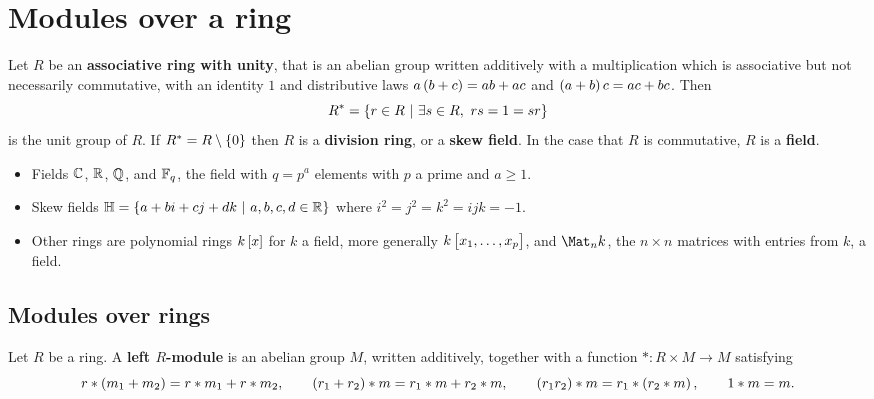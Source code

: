 \def\module{M4P63 Algebra IV}
\def\lecturer{Dr John Britnell}
\def\term{Spring 2020}
\def\cover{}
\def\syllabus{}
\def\thm{section}







\setcounter{section}{0}

\section{Modules over a ring}


Let $ R $ be an \textbf{associative ring with unity}, that is an abelian group written additively with a multiplication which is associative but not necessarily commutative, with an identity $ 1 $ and distributive laws $ a\br{b + c} = ab + ac $ and $ \br{a + b}c = ac + bc $. Then
$$ R^* = \cbr{r \in R \st \exists s \in R, \ rs = 1 = sr} $$
is the unit group of $ R $. If $ R^* = R \setminus \cbr{0} $ then $ R $ is a \textbf{division ring}, or a \textbf{skew field}. In the case that $ R $ is commutative, $ R $ is a \textbf{field}.

\begin{example*}
\hfill
\begin{itemize}
\item Fields $ \mathbb{C} $, $ \mathbb{R} $, $ \mathbb{Q} $, and $ \mathbb{F}_q $, the field with $ q = p^a $ elements with $ p $ a prime and $ a \ge 1 $.
\item Skew fields $ \HH = \cbr{a + bi + cj + dk \st a, b, c, d \in \RR} $ where $ i^2 = j^2 = k^2 = ijk = -1 $.
\item Other rings are polynomial rings $ k\sbr{x} $ for $ k $ a field, more generally $ k\sbr{x_1, \dots, x_p} $, and $ \Mat_n k $, the $ n \times n $ matrices with entries from $ k $, a field.
\end{itemize}
\end{example*}

\subsection{Modules over rings}

\begin{definition}
Let $ R $ be a ring. A \textbf{left $ R $-module} is an abelian group $ M $, written additively, together with a function $ * : R \times M \to M $ satisfying
$$ r * \br{m_1 + m_2} = r * m_1 + r * m_2, \qquad \br{r_1 + r_2} * m = r_1 * m + r_2 * m, \qquad \br{r_1r_2} * m = r_1 * \br{r_2 * m}, \qquad 1 * m = m. $$
\end{definition}

